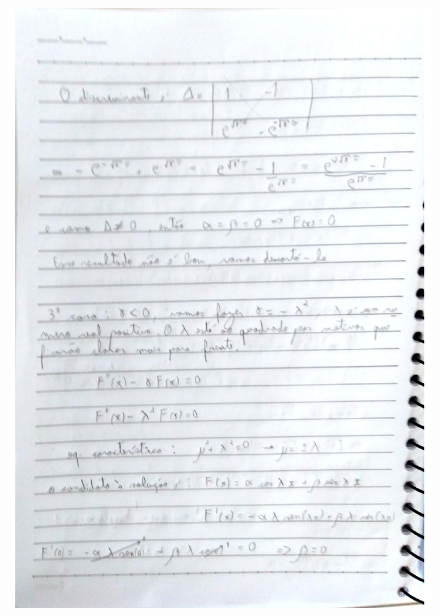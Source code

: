 \documentclass[a4paper]{article}
\begin{document}
        \begin{figure}{\textwidth}
            \centering
            \includegraphics[width=\textwidth]{Questoes-1-3_page-0004.jpg}
        \end{figure}
\end{document}
